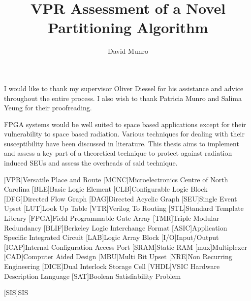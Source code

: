 \documentclass[12pt,final,oneside]{dwThesis} %
\title{VPR Assessment of a Novel Partitioning Algorithm}
\author{David Munro}
\begin{document}
   \maketitle
   \begin{acknowledgements}
      I would like to thank my supervisor Oliver Diessel for his assistance and advice throughout the entire process. I also wish to thank Patricia Munro and Salima Yeung for their proofreading.

   \end{acknowledgements}
   \begin{abstracts}
      \ac{FPGA} systems would be well suited to space based applications except for their vulnerability to space based radiation. Various techniques for dealing with their susceptibility have been discussed in literature. This thesis aims to implement and assess a key part of a theoretical technique to protect against radiation induced \acp{SEU} and assess the overheads of said technique.
      \acresetall
   \end{abstracts}
   \newpage
   \tableofcontents*
   \newpage

   \begin{acronym}
      [VPR]{Versatile Place and Route}
      [MCNC]{Microelectronics Centre of North Carolina}
      [BLE]{Basic Logic Element}
      [CLB]{Configurable Logic Block}
      [DFG]{Directed Flow Graph}
      [DAG]{Directed Acyclic Graph}
      [SEU]{Single Event Upset}
      [LUT]{Look Up Table}
      [VTR]{Verilog To Routing}
      [STL]{Standard Template Library}
      [FPGA]{Field Programmable Gate Array}
      [TMR]{Triple Modular Redundancy}
      [BLIF]{Berkeley Logic Interchange Format}
      [ASIC]{Application Specific Integrated Circuit}
      [LAB]{Logic Array Block}
      [I/O]{Input/Output}
      [ICAP]{Internal Configuration Access Port}
      [SRAM]{Static RAM}
      [mux]{Multiplexer}
      [CAD]{Computer Aided Design}
      [MBU]{Multi Bit Upset}
      [NRE]{Non Recurring Engineering}
      [DICE]{Dual Interlock Storage Cell}
      [VHDL]{VSIC Hardware Description Language}
      [SAT]{Boolean Satisfiability Problem}

      [SIS]{SIS}
   \end{acronym}
\end{document}
